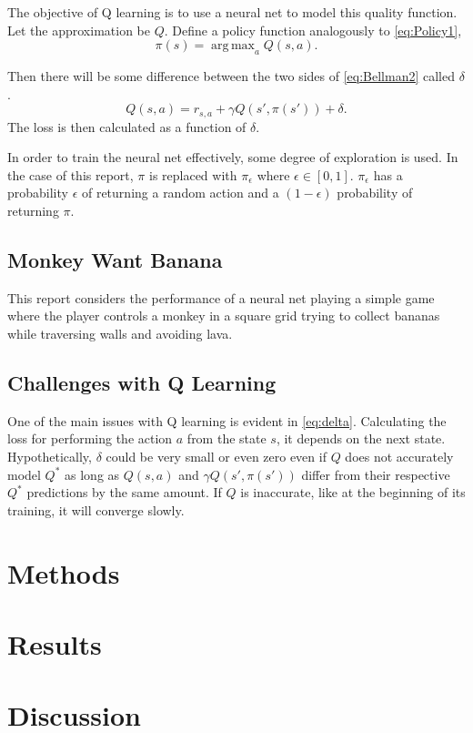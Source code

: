 \documentclass[%
 reprint,
nofootinbib,
 amsmath,amssymb,
 aps,
]{revtex4-1}
\DeclareMathOperator*{\argmax}{arg\,max}
\begin{document}
The objective of Q learning is to use a neural net to model this quality function. Let the approximation be $Q$. Define a policy function analogously to \eqref{eq:Policy1},
\begin{equation}
  \pi(s) = \argmax_a Q(s,a). \label{eq:Policy2}
\end{equation}

 Then there will be some difference between the two sides of \eqref{eq:Bellman2} called $\delta$.
\begin{equation}
  Q(s,a) = r_{s,a} + \gamma Q(s', \pi(s')) + \delta. \label{eq:delta}
\end{equation}
The loss is then calculated as a function of $\delta$.

In order to train the neural net effectively, some degree of exploration is used. In the case of this report, $\pi$ is replaced with $\pi_\epsilon$ where $\epsilon\in[0,1]$. $\pi_\epsilon$ has a probability $\epsilon$ of returning a random action and a $(1-\epsilon)$ probability of returning $\pi$. 

\subsection{\label{sec:Monkey}Monkey Want Banana}
This report considers the performance of a neural net playing a simple game where the player controls a monkey in a square grid trying to collect bananas while traversing walls and avoiding lava.

\subsection{\label{sec:Challenges}Challenges with Q Learning}
One of the main issues with Q learning is evident in \eqref{eq:delta}. Calculating the loss for performing the action $a$ from the state $s$, it depends on the next state. Hypothetically, $\delta$ could be very small or even zero even if $Q$ does not accurately model $Q^*$ as long as $Q(s,a)$ and $\gamma Q(s', \pi(s'))$ differ from their respective $Q^*$ predictions by the same amount. If $Q$ is inaccurate, like at the beginning of its training, it will converge slowly.


\section{\label{sec:Methods}Methods}

\section{\label{sec:Results}Results}

\section{\label{sec:Discussion}Discussion}



\end{document}
